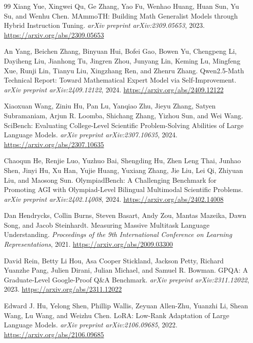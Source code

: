 \begin{thebibliography}{99}
Xiang Yue, Xingwei Qu, Ge Zhang, Yao Fu, Wenhao Huang, Huan Sun, Yu Su, and Wenhu Chen. {MAmmoTH}: Building Math Generalist Models through Hybrid Instruction Tuning. \emph{arXiv preprint arXiv:2309.05653}, 2023. \url{https://arxiv.org/abs/2309.05653}

An Yang, Beichen Zhang, Binyuan Hui, Bofei Gao, Bowen Yu, Chengpeng Li, Dayiheng Liu, Jianhong Tu, Jingren Zhou, Junyang Lin, Keming Lu, Mingfeng Xue, Runji Lin, Tianyu Liu, Xingzhang Ren, and Zhenru Zhang. {Qwen2.5-Math} Technical Report: Toward Mathematical Expert Model via Self-Improvement. \emph{arXiv preprint arXiv:2409.12122}, 2024. \url{https://arxiv.org/abs/2409.12122}

Xiaoxuan Wang, Ziniu Hu, Pan Lu, Yanqiao Zhu, Jieyu Zhang, Satyen Subramaniam, Arjun R. Loomba, Shichang Zhang, Yizhou Sun, and Wei Wang. {SciBench}: Evaluating College-Level Scientific Problem-Solving Abilities of Large Language Models. \emph{arXiv preprint arXiv:2307.10635}, 2024. \url{https://arxiv.org/abs/2307.10635}

Chaoqun He, Renjie Luo, Yuzhuo Bai, Shengding Hu, Zhen Leng Thai, Junhao Shen, Jinyi Hu, Xu Han, Yujie Huang, Yuxiang Zhang, Jie Liu, Lei Qi, Zhiyuan Liu, and Maosong Sun. {OlympiadBench}: A Challenging Benchmark for Promoting {AGI} with Olympiad-Level Bilingual Multimodal Scientific Problems. \emph{arXiv preprint arXiv:2402.14008}, 2024. \url{https://arxiv.org/abs/2402.14008}

Dan Hendrycks, Collin Burns, Steven Basart, Andy Zou, Mantas Mazeika, Dawn Song, and Jacob Steinhardt. Measuring Massive Multitask Language Understanding. \emph{Proceedings of the 9th International Conference on Learning Representations}, 2021. \url{https://arxiv.org/abs/2009.03300}

David Rein, Betty Li Hou, Asa Cooper Stickland, Jackson Petty, Richard Yuanzhe Pang, Julien Dirani, Julian Michael, and Samuel R. Bowman. {GPQA}: A Graduate-Level Google-Proof Q\&A Benchmark. \emph{arXiv preprint arXiv:2311.12022}, 2023. \url{https://arxiv.org/abs/2311.12022}

Edward J. Hu, Yelong Shen, Phillip Wallis, Zeyuan Allen-Zhu, Yuanzhi Li, Shean Wang, Lu Wang, and Weizhu Chen. {LoRA}: Low-Rank Adaptation of Large Language Models. \emph{arXiv preprint arXiv:2106.09685}, 2022. \url{https://arxiv.org/abs/2106.09685}


\end{thebibliography}
